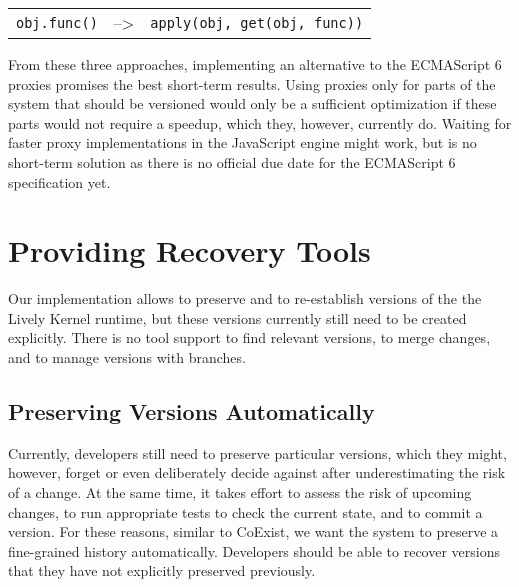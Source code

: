 \begin{center}
    \begin{tabular}{ lll }
    \lstinline|obj.func()| & --> & \lstinline|apply(obj, get(obj, func))| \\
    \end{tabular}
\end{center}

From these three approaches, implementing an alternative to the ECMAScript 6 proxies promises the best short-term results.
Using proxies only for parts of the system that should be versioned would only be a sufficient optimization if these parts would not require a speedup, which they, however, currently do.
Waiting for faster proxy implementations in the JavaScript engine might work, but is no short-term solution as there is no official due date for the ECMAScript 6 specification yet.


\section{Providing Recovery Tools}

Our implementation allows to preserve and to re-establish versions of the the Lively Kernel runtime, but these versions currently still need to be created explicitly.
There is no tool support to find relevant versions, to merge changes, and to manage versions with branches.


\subsection{Preserving Versions Automatically}

Currently, developers still need to preserve particular versions, which they might, however, forget or even deliberately decide against after underestimating the risk of a change.
At the same time, it takes effort to assess the risk of upcoming changes, to run appropriate tests to check the current state, and to commit a version.
For these reasons, similar to CoExist, we want the system to preserve a fine-grained history automatically.
Developers should be able to recover versions that they have not explicitly preserved previously.

